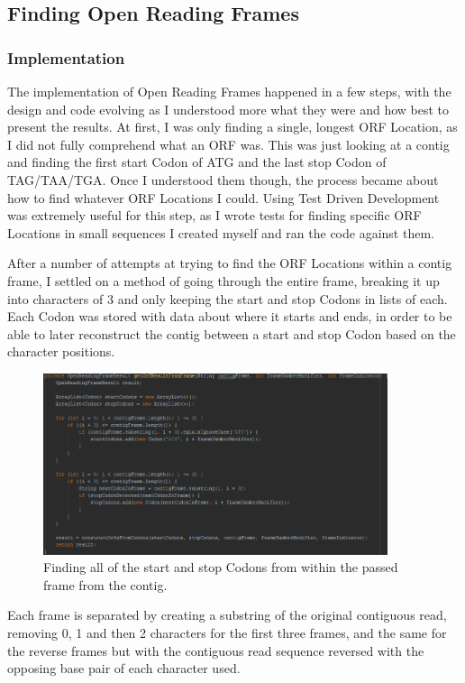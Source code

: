 \subsection{Finding Open Reading Frames}
\subsubsection{Implementation}
The implementation of Open Reading Frames happened in a few steps, with the design and code evolving as I understood more what they were and how best to present the results. At first, I was only finding a single, longest ORF Location, as I did not fully comprehend what an ORF was. This was just looking at a contig and finding the first start Codon of ATG and the last stop Codon of TAG/TAA/TGA. Once I understood them though, the process became about how to find whatever ORF Locations I could. Using Test Driven Development was extremely useful for this step, as I wrote tests for finding specific ORF Locations in small sequences I created myself and ran the code against them.

After a number of attempts at trying to find the ORF Locations within a contig frame, I settled on a method of going through the entire frame, breaking it up into characters of 3 and only keeping the start and stop Codons in lists of each. Each Codon was stored with data about where it starts and ends, in order to be able to later reconstruct the contig between a start and stop Codon based on the character positions.

\begin{figure}[H]
\centering
\includegraphics[width=0.9\textwidth]{images/orffind2}
\caption{Finding all of the start and stop Codons from within the passed frame from the contig.}
\end{figure}


Each frame is separated by creating a substring of the original contiguous read, removing 0, 1 and then 2 characters for the first three frames, and the same for the reverse frames but with the contiguous read sequence reversed with the opposing base pair of each character used. 


